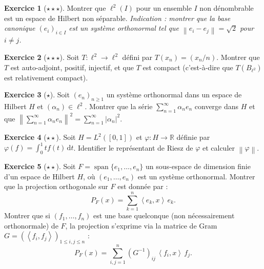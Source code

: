 \documentclass[a4paper,12pt]{book}
\DeclareMathOperator{\spn}{span}
\newcommand{\R}{\mathbb{R}}
\newcommand{\dd}{\mathrm{d}}
\newcommand{\norm}[1]{\left\| #1 \right\|}
\newcommand{\abs}[1]{\left| #1 \right|}
\newcommand{\inner}[2]{\left\langle #1, #2 \right\rangle}
\theoremstyle{definition}
\newtheorem{exercice}{Exercice}[chapter]
\theoremstyle{plain}
\theoremstyle{remark}
\begin{document}
\begin{exercice}[$\star\star\star$]\label{exo:ch2-hilbert-non-separable}
Montrer que $\ell^2(I)$ pour un ensemble $I$ non dénombrable est un espace de Hilbert non séparable. \textit{Indication : montrer que la base canonique $(e_i)_{i\in I}$ est un système orthonormal tel que $\norm{e_i - e_j} = \sqrt{2}$ pour $i \neq j$.}
\end{exercice}

\begin{exercice}[$\star\star\star$]\label{exo:ch2-operateur-compact}
Soit $T : \ell^2 \to \ell^2$ défini par $T(x_n) = (x_n/n)$. Montrer que $T$ est auto-adjoint, positif, injectif, et que $T$ est compact (c'est-à-dire que $T(B_{\ell^2})$ est relativement compact).
\end{exercice}

\begin{exercice}[$\star$]\label{exo:ch2-pythagore-infini}
Soit $(e_n)_{n\geq 1}$ un système orthonormal dans un espace de Hilbert $H$ et $(\alpha_n) \in \ell^2$. Montrer que la série $\sum_{n=1}^\infty \alpha_n e_n$ converge dans $H$ et que $\norm{\sum_{n=1}^\infty \alpha_n e_n}^2 = \sum_{n=1}^\infty \abs{\alpha_n}^2$.
\end{exercice}

\begin{exercice}[$\star\star$]\label{exo:ch2-riesz-app}
Soit $H = L^2([0,1])$ et $\varphi : H \to \R$ définie par $\varphi(f) = \int_0^1 t f(t)\,\dd t$. Identifier le représentant de Riesz de $\varphi$ et calculer $\norm{\varphi}$.
\end{exercice}

\begin{exercice}[$\star\star$]\label{exo:ch2-proj-formule}
Soit $F = \spn\{e_1, \ldots, e_n\}$ un sous-espace de dimension finie d'un espace de Hilbert $H$, où $(e_1, \ldots, e_n)$ est un système orthonormal. Montrer que la projection orthogonale sur $F$ est donnée par :
\[
    P_F(x) = \sum_{k=1}^n \inner{e_k}{x}\, e_k.
\]
Montrer que si $(f_1, \ldots, f_n)$ est une base quelconque (non nécessairement orthonormale) de $F$, la projection s'exprime via la matrice de Gram $G = (\inner{f_i}{f_j})_{1\leq i,j\leq n}$ :
\[
    P_F(x) = \sum_{i,j=1}^n (G^{-1})_{ij}\, \inner{f_i}{x}\, f_j.
\]
\end{exercice}
\end{document}
